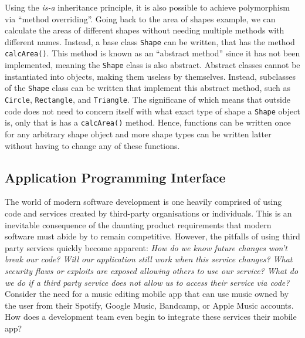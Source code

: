 \documentclass[11pt]{article}
\begin{document}
Using the \textit{is-a} inheritance principle, it is also possible to achieve polymorphism via ``method overriding''. Going back to the area of shapes example, we can calculate the areas of different shapes without needing multiple methods with different names. Instead, a base class \texttt{Shape} can be written, that has the method \texttt{calcArea()}. This method is known as an ``abstract method'' since it has not been implemented, meaning the \texttt{Shape} class is also abstract. Abstract classes cannot be instantiated into objects, making them useless by themselves. Instead, subclasses of the \texttt{Shape} class can be written that implement this abstract method, such as \texttt{Circle}, \texttt{Rectangle}, and \texttt{Triangle}. The significane of which means that outside code does not need to concern itself with what exact type of shape a \texttt{Shape} object is, only that is has a \texttt{calcArea()} method. Hence, functions can be written once for any arbitrary shape object and more shape types can be written latter without having to change any of these functions.

\subsection{Application Programming Interface}

The world of modern software development is one heavily comprised of using code and services created by third-party organisations or individuals. This is an inevitable consequence of the daunting product requirements that modern software must abide by to remain competitive. However, the pitfalls of using third party services quickly become apparent: \textit{How do we know future changes won't break our code? Will our application still work when this service changes? What security flaws or exploits are exposed allowing others to use our service? What do we do if a third party service does not allow us to access their service via code?} Consider the need for a music editing mobile app that can use music owned by the user from their Spotify, Google Music, Bandcamp, or Apple Music accounts. How does a development team even begin to integrate these services their mobile app?
\end{document}
